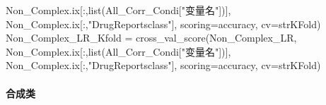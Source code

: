 \documentclass[
]{article}
\newenvironment{Shaded}{}{}
\newcommand{\BuiltInTok}[1]{#1}
\newcommand{\NormalTok}[1]{#1}
\newcommand{\OperatorTok}[1]{\textcolor[rgb]{0.40,0.40,0.40}{#1}}
\newcommand{\StringTok}[1]{\textcolor[rgb]{0.25,0.44,0.63}{#1}}
\begin{document}
\begin{Shaded}
\begin{Highlighting}[]
\NormalTok{                            Non\_Complex.ix[:,}\BuiltInTok{list}\NormalTok{(All\_Corr\_Condi[}\StringTok{"变量名"}\NormalTok{])],}
\NormalTok{                            Non\_Complex.ix[:,}\StringTok{"DrugReportsclass"}\NormalTok{],}
\NormalTok{                            scoring}\OperatorTok{=}\StringTok{\textquotesingle{}accuracy\textquotesingle{}}\NormalTok{,}
\NormalTok{                            cv}\OperatorTok{=}\NormalTok{strKFold)}
\NormalTok{Non\_Complex\_LR\_Kfold }\OperatorTok{=}\NormalTok{ cross\_val\_score(Non\_Complex\_LR,}
\NormalTok{                            Non\_Complex.ix[:,}\BuiltInTok{list}\NormalTok{(All\_Corr\_Condi[}\StringTok{"变量名"}\NormalTok{])],}
\NormalTok{                            Non\_Complex.ix[:,}\StringTok{"DrugReportsclass"}\NormalTok{],}
\NormalTok{                            scoring}\OperatorTok{=}\StringTok{\textquotesingle{}accuracy\textquotesingle{}}\NormalTok{,}
\NormalTok{                            cv}\OperatorTok{=}\NormalTok{strKFold)}
\end{Highlighting}
\end{Shaded}

\hypertarget{header-n318}{%
\paragraph{合成类}\label{header-n318}}
\end{document}
